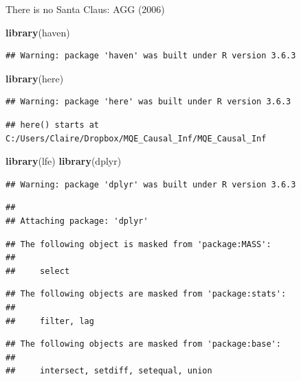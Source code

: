 \documentclass[
  ignorenonframetext,
]{beamer}
\newenvironment{Shaded}{\begin{snugshade}}{\end{snugshade}}
\newcommand{\KeywordTok}[1]{\textcolor[rgb]{0.13,0.29,0.53}{\textbf{#1}}}
\newcommand{\NormalTok}[1]{#1}
\begin{document}
\begin{frame}[fragile]{There is no Santa Claus: AGG (2006)}
\protect\hypertarget{there-is-no-santa-claus-agg-2006}{}
\tiny

\begin{Shaded}
\begin{Highlighting}[]
\KeywordTok{library}\NormalTok{(haven)}
\end{Highlighting}
\end{Shaded}

\begin{verbatim}
## Warning: package 'haven' was built under R version 3.6.3
\end{verbatim}

\begin{Shaded}
\begin{Highlighting}[]
\KeywordTok{library}\NormalTok{(here)}
\end{Highlighting}
\end{Shaded}

\begin{verbatim}
## Warning: package 'here' was built under R version 3.6.3
\end{verbatim}

\begin{verbatim}
## here() starts at C:/Users/Claire/Dropbox/MQE_Causal_Inf/MQE_Causal_Inf
\end{verbatim}

\begin{Shaded}
\begin{Highlighting}[]
\KeywordTok{library}\NormalTok{(lfe)}
\KeywordTok{library}\NormalTok{(dplyr)}
\end{Highlighting}
\end{Shaded}

\begin{verbatim}
## Warning: package 'dplyr' was built under R version 3.6.3
\end{verbatim}

\begin{verbatim}
## 
## Attaching package: 'dplyr'
\end{verbatim}

\begin{verbatim}
## The following object is masked from 'package:MASS':
## 
##     select
\end{verbatim}

\begin{verbatim}
## The following objects are masked from 'package:stats':
## 
##     filter, lag
\end{verbatim}

\begin{verbatim}
## The following objects are masked from 'package:base':
## 
##     intersect, setdiff, setequal, union
\end{verbatim}
\end{frame}
\end{document}
